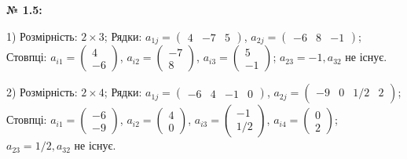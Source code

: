\documentclass[12pt,a4paper]{article}
\begin{document}
    \noindent \textbf{№ 1.5:}

    \vspace{1em}
    1) Розмірність: $2\times3$; Рядки: \( a_{1j} = 
    \begin{pmatrix}
    4 & -7 & 5 
    \end{pmatrix}
    \), \( a_{2j} = 
    \begin{pmatrix}
    -6 & 8 & -1 
    \end{pmatrix}
    \); Стовпці: \( a_{i1} = 
    \begin{pmatrix}
    4 \\
    -6
    \end{pmatrix}
    \), \( a_{i2} = 
    \begin{pmatrix}
    -7 \\
    8
    \end{pmatrix}
    \), \( a_{i3} = 
    \begin{pmatrix}
    5 \\
    -1
    \end{pmatrix}
    \); $a_{23} = -1, a_{32}$ не існує.

    \vspace{1em}
    2) Розмірність: $2\times4$; Рядки: \( a_{1j} = 
    \begin{pmatrix}
    -6 & 4 & -1 & 0 
    \end{pmatrix}
    \), \( a_{2j} = 
    \begin{pmatrix}
    -9 & 0 & 1/2 & 2 
    \end{pmatrix}
    \); Стовпці: \( a_{i1} = 
    \begin{pmatrix}
    -6 \\
    -9
    \end{pmatrix}
    \), \( a_{i2} = 
    \begin{pmatrix}
    4 \\
    0
    \end{pmatrix}
    \), \( a_{i3} = 
    \begin{pmatrix}
    -1 \\
    1/2
    \end{pmatrix}
    \), \( a_{i4} = 
    \begin{pmatrix}
    0 \\
    2
    \end{pmatrix}
    \); $a_{23} = 1/2, a_{32}$ не існує.
\end{document}
